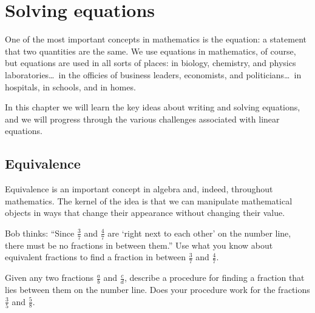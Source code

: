 \chapter{Solving equations}
\label{ch:equations}


One of the most important concepts in mathematics is the equation: a statement that two quantities are the same. We use equations in mathematics, of course, but equations are used in all sorts of places: in biology, chemistry, and physics laboratories\ldots\ in the officies of business leaders, economists, and politicians\ldots\ in hospitals, in schools, and in homes.

In this chapter we will learn the key ideas about writing and solving equations, and we will progress through the various challenges associated with linear equations.

\section{Equivalence}
\label{sec:equivalence}

Equivalence is an important concept in algebra and, indeed, throughout mathematics. The kernel of the idea is that we can manipulate mathematical objects in ways that change their appearance without changing their value.

\begin{boxexplore}
Bob thinks: ``Since $\frac{3}{7}$ and $\frac{4}{7}$ are `right next to each other' on the number line, there must be no fractions in between them.'' Use what you know about equivalent fractions to find a fraction in between $\frac{3}{7}$ and $\frac{4}{7}$.

Given any two fractions $\frac{a}{b}$ and $\frac{c}{d}$, describe a procedure for finding a fraction that lies between them on the number line. Does your procedure work for the fractions $\frac{3}{5}$ and $\frac{5}{8}$.
\end{boxexplore} %




